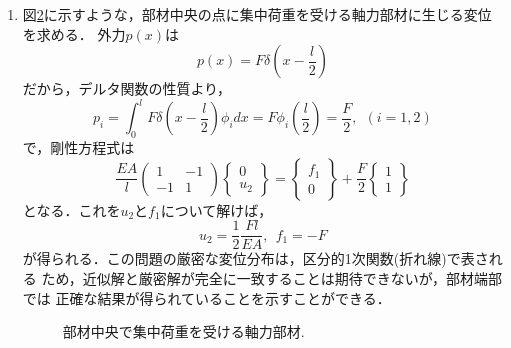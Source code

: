 \documentclass[10pt,a4j]{jarticle}
\begin{document}
\begin{enumerate}
\begin{equation}
\begin{array}{c}
		1	
	\end{array}
	\right\}
\end{equation}
となり，
\begin{equation}
	u_2=\frac{p_0l^2}{2EA}, \ \ f_1=-p_0l
\end{equation}
が得られる．よって，変位の近似解は
\begin{equation}
	\tilde u(x)= \frac{p_0l^2}{2EA}\frac{x}{l}
\end{equation}
で，厳密解は$x$の2次関数だから，この問題では近似解と厳密解は一致し得ない．
しかしながら，部材端部では，近似解と厳密解が一致することを確かめることができる．
\begin{figure}[h]
	\begin{center}
	\end{center}
	\caption{等分布荷重を受ける軸力部材.} 
	\label{fig:fig4}
\end{figure}
\item
図\ref{fig:fig5}に示すような，部材中央の点に集中荷重を受ける軸力部材に生じる変位を求める．
外力$p(x)$は
\begin{equation}
	p(x)=F\delta \left( x-\frac{l}{2}\right)
\end{equation}
だから，デルタ関数の性質より，
\begin{equation}
	p_i=\int_0^l F \delta\left(x-\frac{l}{2}\right)\phi_i dx =F\phi_i\left(\frac{l}{2}\right)= \frac{F}{2}
	, \ \ (i=1,2)
	\label{eqn:}
\end{equation}
で，剛性方程式は
\begin{equation}
	\frac{EA}{l}
	\left(
	\begin{array}{cc}
		1 & -1 \\
		-1 & 1
	\end{array}
	\right)
	\left\{
	\begin{array}{c}
		0 \\
		u_2
	\end{array}
	\right\}
	=
	\left\{
	\begin{array}{c}
		f_1 \\
		0	
	\end{array}
	\right\}
	+
	\frac{F}{2}
	\left\{
	\begin{array}{c}
		1 \\
		1	
	\end{array}
	\right\}
\end{equation}
となる．これを$u_2$と$f_1$について解けば，
\begin{equation}
	u_2=\frac{1}{2}\frac{Fl}{EA}, \ \ f_1=-F
	\label{eqn:}
\end{equation}
が得られる．この問題の厳密な変位分布は，区分的1次関数(折れ線)で表される
ため，近似解と厳密解が完全に一致することは期待できないが，部材端部では
正確な結果が得られていることを示すことができる．
\begin{figure}[h]
	\begin{center}
	\end{center}
	\caption{部材中央で集中荷重を受ける軸力部材.} 
	\label{fig:fig5}
\end{figure}
\end{enumerate}
\end{document}
